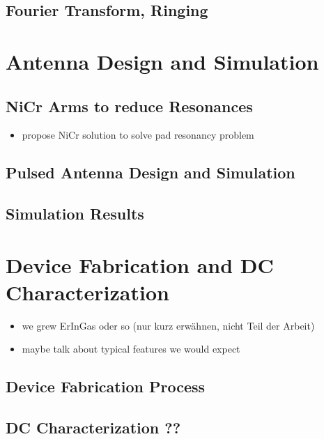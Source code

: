\documentclass[
	german,%
	accentcolor=9c,%
	ruledheaders=section,%
	class=report,%
	thesis={type=bachelor},%
	fontsize=11pt,%
	parskip=half-,%
	custommargins=false,%
	marginpar=false,%
	BCOR=5mm,%
 	logofile=tools/logo-installation/TUDa-logos/tuda_logo.png,%
]{tudapub}
\begin{document}
\section{Fourier Transform, Ringing}

\chapter{Antenna Design and Simulation}
\section{NiCr Arms to reduce Resonances}
\begin{itemize}
	\item propose NiCr solution to solve pad resonancy problem 
\end{itemize}
\section{Pulsed Antenna Design and Simulation}




\section{Simulation Results}




\chapter{Device Fabrication and DC Characterization}
\begin{itemize}
	\item we grew ErInGas oder so (nur kurz erwähnen, nicht Teil der Arbeit)
	\item maybe talk about typical features we would expect 
\end{itemize}


\section{Device Fabrication Process}

\section{DC Characterization ??}
\end{document}
